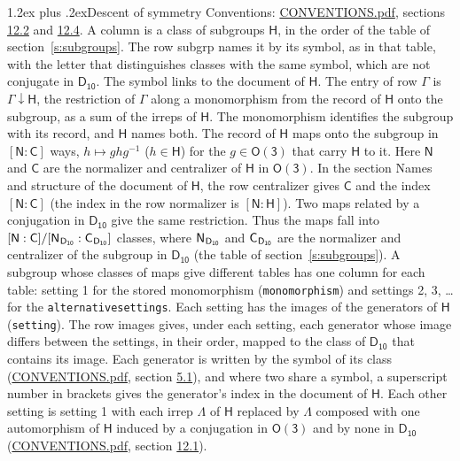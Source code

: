 \documentclass[10pt,a4paper]{article}
\makeatletter
\renewcommand\section{\@startsection{section}{1}{\z@}{-3ex plus -1ex minus -.2ex}%
  {1.2ex plus .2ex}{\normalfont\large\sffamily\bfseries\color{parttitle}}}
\numberwithin{equation}{section}
\newcommand{\grp}[1]{\mathsf{#1}}
\newcommand{\grpindex}[2]{[#1 : #2]}
\newcommand{\restr}[2]{#1\!\downarrow#2}
\newcommand{\hairsp}{\mkern1mu}
\makeatother
\begin{document}
\section{Descent of symmetry}\label{s:subduction}
Conventions: \href{../../CONVENTIONS.pdf}{CONVENTIONS.pdf}, sections \href{../../CONVENTIONS.pdf\#conv.12.2}{12.2} and \href{../../CONVENTIONS.pdf\#conv.12.4}{12.4}.
A column is a class of subgroups $\grp{H}$, in the order of the table of section~\ref{s:subgroups}. The row subgrp names it by its symbol, as in that table, with the letter that distinguishes classes with the same symbol, which are not conjugate in $\grp{D_{10}}$. The symbol links to the document of $\grp{H}$. The entry of row $\Gamma$ is $\restr{\Gamma}{\grp{H}}$, the restriction of $\Gamma$ along a monomorphism from the record of $\grp{H}$ onto the subgroup, as a sum of the irreps of $\grp{H}$. The monomorphism identifies the subgroup with its record, and $\grp{H}$ names both. \label{n:group.normalizer.o3}\label{n:group.centralizer.o3}The record of $\grp{H}$ maps onto the subgroup in $\grpindex{\grp{N}}{\grp{C}}$ ways, $h \mapsto g h g^{-1}$ ($h \in \grp{H}$) for the $g \in \grp{O(3)}$ that carry $\grp{H}$ to it. Here $\grp{N}$ and $\grp{C}$ are the normalizer and centralizer of $\grp{H}$ in \href{O3.pdf}{$\grp{O(3)}$}. In the section Names and structure of the document of $\grp{H}$, the row centralizer gives $\grp{C}$ and the index $\grpindex{\grp{N}}{\grp{C}}$ (the index in the row normalizer is $\grpindex{\grp{N}}{\grp{H}}$). Two maps related by a conjugation in $\grp{D_{10}}$ give the same restriction. Thus the maps fall into $\grpindex{\grp{N}}{\grp{C}}/\grpindex{\grp{N}_{\hairsp \grp{D_{10}}}}{\grp{C}_{\hairsp \grp{D_{10}}}}$ classes, where $\grp{N}_{\hairsp \grp{D_{10}}}$ and $\grp{C}_{\hairsp \grp{D_{10}}}$ are the normalizer and centralizer of the subgroup in $\grp{D_{10}}$ (the table of section~\ref{s:subgroups}). \label{n:head.setting}A subgroup whose classes of maps give different tables has one column for each table: setting 1 for the stored monomorphism (\texttt{monomorphism}) and settings 2, 3, \dots{} for the \texttt{alternativesettings}. Each setting has the images of the generators of $\grp{H}$ (\texttt{setting}). \label{n:head.images}The row images gives, under each setting, each generator whose image differs between the settings, in their order, mapped to the class of $\grp{D_{10}}$ that contains its image. \label{n:element.generator.index}Each generator is written by the symbol of its class (\href{../../CONVENTIONS.pdf}{CONVENTIONS.pdf}, section \href{../../CONVENTIONS.pdf\#conv.5.1}{5.1}), and where two share a symbol, a superscript number in brackets gives the generator's index in the document of $\grp{H}$. \label{n:irrep.Delta}Each other setting is setting 1 with each irrep $\Lambda$ of $\grp{H}$ replaced by $\Lambda$ composed with one automorphism of $\grp{H}$ induced by a conjugation in \href{O3.pdf}{$\grp{O(3)}$} and by none in $\grp{D_{10}}$ (\href{../../CONVENTIONS.pdf}{CONVENTIONS.pdf}, section \href{../../CONVENTIONS.pdf\#conv.12.1}{12.1}).
\end{document}
